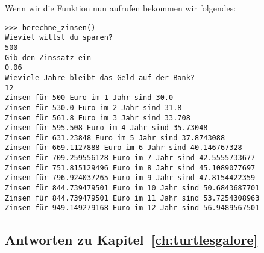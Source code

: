 \noindent
Wenn wir die Funktion nun aufrufen bekommen wir folgendes:

\begin{Verbatim}[frame=single]
>>> berechne_zinsen()
Wieviel willst du sparen?
500
Gib den Zinssatz ein
0.06
Wieviele Jahre bleibt das Geld auf der Bank?
12
Zinsen für 500 Euro im 1 Jahr sind 30.0
Zinsen für 530.0 Euro im 2 Jahr sind 31.8
Zinsen für 561.8 Euro im 3 Jahr sind 33.708
Zinsen für 595.508 Euro im 4 Jahr sind 35.73048
Zinsen für 631.23848 Euro im 5 Jahr sind 37.8743088
Zinsen für 669.1127888 Euro im 6 Jahr sind 40.146767328
Zinsen für 709.259556128 Euro im 7 Jahr sind 42.5555733677
Zinsen für 751.815129496 Euro im 8 Jahr sind 45.1089077697
Zinsen für 796.924037265 Euro im 9 Jahr sind 47.8154422359
Zinsen für 844.739479501 Euro im 10 Jahr sind 50.6843687701
Zinsen für 844.739479501 Euro im 11 Jahr sind 53.7254308963
Zinsen für 949.149279168 Euro im 12 Jahr sind 56.9489567501
\end{Verbatim}


\subsection*{Antworten zu Kapitel~\ref{ch:turtlesgalore}}

